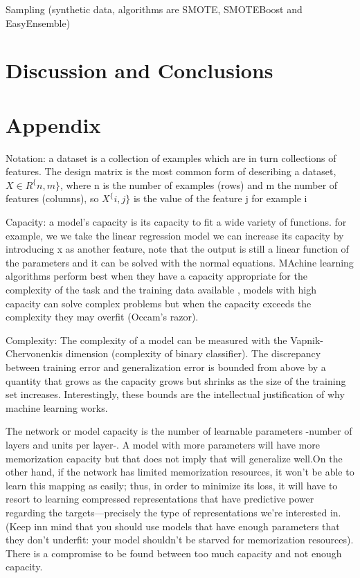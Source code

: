 \documentclass[11pt]{article}
\begin{document}
Sampling (synthetic data, algorithms are SMOTE, SMOTEBoost and EasyEnsemble)


\section{Discussion and Conclusions}
\label{se:dis}

\section{Appendix}
\label{se:ap}
Notation:  a dataset is a collection of examples which are in turn collections of features. The design matrix is the most common form of describing a dataset, $X \in R^\{n,m\}$, where n is the number of examples (rows) and m the number of features (columns), so $X^\{i,j\}$ is the value of the feature j for example i

Capacity: a model's capacity is its capacity to fit a wide variety of functions. for example, we we take the linear regression model we can increase its capacity by introducing x as another feature, note that the output is still a linear function of the parameters and it can be solved with the normal equations. MAchine learning algorithms perform best when they have a capacity appropriate for the complexity of the task and the training data available , models with high capacity can solve complex problems but when the capacity exceeds the complexity they may overfit (Occam's razor). 

Complexity: The complexity of a model can be measured with the Vapnik-Chervonenkis dimension (complexity of binary classifier). The discrepancy between training error and generalization error is bounded from above by a quantity that grows as the capacity grows but shrinks as the size of the training set increases. Interestingly, these bounds are the intellectual justification of why machine learning works.

The network or model capacity is the number of learnable parameters -number of layers and units per layer-. A model with more parameters will have more memorization capacity but that does not imply that will generalize well.On the other hand, if the network has limited memorization resources, it won’t be able to learn this mapping as easily; thus, in order to minimize its loss, it will have to resort to learning compressed representations that have predictive power regarding the targets—precisely the type of representations we’re interested in. (Keep inn mind that you should use models that have enough parameters that they don’t underfit: your model shouldn’t be starved for memorization resources). There is a compromise to be found between too much capacity and not enough capacity.

\newpage





\end{document}
